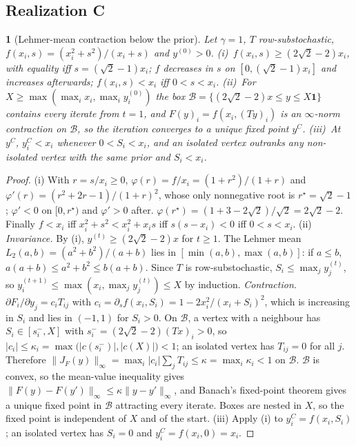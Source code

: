 \documentclass[11pt,a4paper]{article}
\theoremstyle{definition}
\theoremstyle{plain}
\newcommand{\genpropname}{}
\newtheorem*{genprop}{\genpropname}
\newenvironment{prop}[1]{\renewcommand{\genpropname}{Proposition #1}\begin{genprop}}{\end{genprop}}
\newcommand{\one}{\mathbf{1}}
\begin{document}
\subsection{Realization C}

\begin{prop}{D}[Lehmer-mean contraction below the prior]
Let $\gamma=1$, $T$ row-substochastic, $f(x_i,s)=(x_i^2+s^2)/(x_i+s)$ and $y^{(0)}>0$. (i)~$f(x_i,s)\ge(2\sqrt2-2)x_i$, with equality iff $s=(\sqrt2-1)x_i$; $f$ decreases in $s$ on $[0,(\sqrt2-1)x_i]$ and increases afterwards; $f(x_i,s)<x_i$ iff $0<s<x_i$. (ii)~For $X\ge\max(\max_ix_i,\max_iy_i^{(0)})$ the box $\mathcal B=\{(2\sqrt2-2)x\le y\le X\one\}$ contains every iterate from $t=1$, and $F(y)_i=f(x_i,(Ty)_i)$ is an $\infty$-norm contraction on $\mathcal B$, so the iteration converges to a unique fixed point $y^C$. (iii)~At $y^C$, $y^C_i<x_i$ whenever $0<S_i<x_i$, and an isolated vertex outranks any non-isolated vertex with the same prior and $S_i<x_i$.
\end{prop}

\begin{proof}
(i) With $r=s/x_i\ge0$, $\varphi(r)=f/x_i=(1+r^2)/(1+r)$ and $\varphi'(r)=(r^2+2r-1)/(1+r)^2$, whose only nonnegative root is $r^\star=\sqrt2-1$; $\varphi'<0$ on $[0,r^\star)$ and $\varphi'>0$ after. $\varphi(r^\star)=(1+3-2\sqrt2)/\sqrt2=2\sqrt2-2$. Finally $f<x_i$ iff $x_i^2+s^2<x_i^2+x_is$ iff $s(s-x_i)<0$ iff $0<s<x_i$.
(ii) \emph{Invariance.} By (i), $y^{(t)}\ge(2\sqrt2-2)x$ for $t\ge1$. The Lehmer mean $L_2(a,b)=(a^2+b^2)/(a+b)$ lies in $[\min(a,b),\max(a,b)]$: if $a\le b$, $a(a+b)\le a^2+b^2\le b(a+b)$. Since $T$ is row-substochastic, $S_i\le\max_jy_j^{(t)}$, so $y^{(t+1)}_i\le\max(x_i,\max_jy_j^{(t)})\le X$ by induction. \emph{Contraction.} $\partial F_i/\partial y_j=c_iT_{ij}$ with $c_i=\partial_sf(x_i,S_i)=1-2x_i^2/(x_i+S_i)^2$, which is increasing in $S_i$ and lies in $(-1,1)$ for $S_i>0$. On $\mathcal B$, a vertex with a neighbour has $S_i\in[s_i^-,X]$ with $s_i^-=(2\sqrt2-2)(Tx)_i>0$, so $|c_i|\le\kappa_i=\max\big(|c(s_i^-)|,|c(X)|\big)<1$; an isolated vertex has $T_{ij}=0$ for all $j$. Therefore $\|J_F(y)\|_\infty=\max_i|c_i|\sum_jT_{ij}\le\kappa=\max_i\kappa_i<1$ on $\mathcal B$. $\mathcal B$ is convex, so the mean-value inequality gives $\|F(y)-F(y')\|_\infty\le\kappa\|y-y'\|_\infty$, and Banach's fixed-point theorem gives a unique fixed point in $\mathcal B$ attracting every iterate. Boxes are nested in $X$, so the fixed point is independent of $X$ and of the start. (iii) Apply (i) to $y^C_i=f(x_i,S_i)$; an isolated vertex has $S_i=0$ and $y^C_i=f(x_i,0)=x_i$.
\end{proof}
\end{document}
